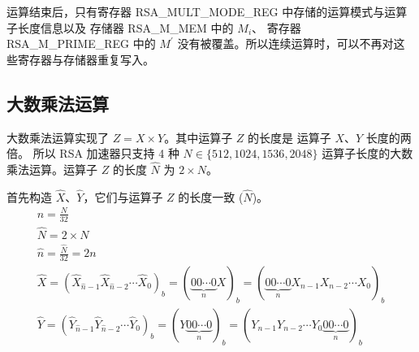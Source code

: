 \documentclass[main\_\_CN.tex]{subfiles}
\begin{document}
运算结束后，只有寄存器 RSA\_MULT\_MODE\_REG 中存储的运算模式与运算子长度信息以及
存储器 RSA\_M\_MEM 中的 \begin{math}M_{i}\end{math}、
寄存器 RSA\_M\_PRIME\_REG 中的 \begin{math}M^{\prime}\end{math} 没有被覆盖。所以连续运算时，可以不再对这些寄存器与存储器重复写入。

\subsection{大数乘法运算}

大数乘法运算实现了 \begin{math}Z = X \times Y\end{math}。其中运算子 \begin{math}Z\end{math} 的长度是
运算子 \begin{math}X\end{math}、\begin{math}Y\end{math} 长度的两倍。
所以 RSA 加速器只支持 4 种 \begin{math}N \in \{512,1024,1536,2048\}\end{math}
运算子长度的大数乘法运算。运算子 \begin{math}Z\end{math} 的长度 \begin{math}\hat{N}\end{math} 为 \begin{math}2 \times N\end{math}。

首先构造 \begin{math}\hat{X}\end{math}、\begin{math}\hat{Y}\end{math}，它们与运算子 \begin{math}Z\end{math} 的长度一致 (\begin{math}\hat{N}\end{math})。
\begin{gather*}
    n = \frac{N}{32} \\
    \hat{N} = 2 \times N\\
    \hat{n} = \frac{\hat{N}}{32} = 2n\\
    \hat{X}
        = ( \hat{X}_{\hat{n}-1} \hat{X}_{\hat{n}-2} \cdots \hat{X}_{0} )_{b}
        = ( \underbrace{0 0 \cdots 0}_{n}
            X )_{b}
        = ( \underbrace{0 0 \cdots 0}_{n}
            X_{n-1} X_{n-2} \cdots X_{0} )_{b} \\
    \hat{Y}
        = ( \hat{Y}_{\hat{n}-1} \hat{Y}_{\hat{n}-2} \cdots \hat{Y}_{0} )_{b}
        = ( Y
            \underbrace{0 0 \cdots 0}_{n} )_{b}
        = ( Y_{n-1} Y_{n-2} \cdots Y_{0}
            \underbrace{0 0 \cdots 0}_{n} )_{b}
\end{gather*}
\end{document}

